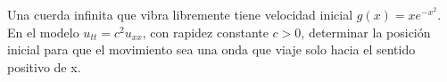 Una cuerda infinita que vibra libremente tiene velocidad inicial \(g(x)=xe^{-x^2}\).
En el modelo \(u_{tt}=c^2u_{xx}\), con rapidez constante \(c>0\), determinar la posición
inicial para que el movimiento sea una onda que viaje solo hacia el sentido positivo de x.
